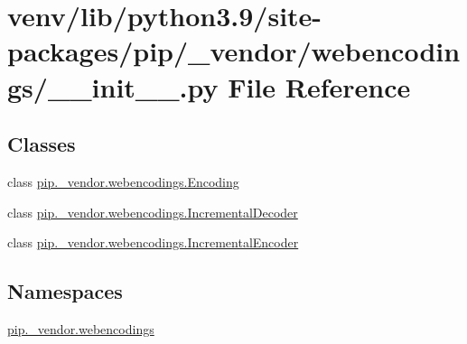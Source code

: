 \hypertarget{venv_2lib_2python3_89_2site-packages_2pip_2__vendor_2webencodings_2____init_____8py}{}\section{venv/lib/python3.9/site-\/packages/pip/\+\_\+vendor/webencodings/\+\_\+\+\_\+init\+\_\+\+\_\+.py File Reference}
\label{venv_2lib_2python3_89_2site-packages_2pip_2__vendor_2webencodings_2____init_____8py}
\subsection*{Classes}
\begin{DoxyCompactItemize}
\item 
class \hyperlink{classpip_1_1__vendor_1_1webencodings_1_1Encoding}{pip.\+\_\+vendor.\+webencodings.\+Encoding}
\item 
class \hyperlink{classpip_1_1__vendor_1_1webencodings_1_1IncrementalDecoder}{pip.\+\_\+vendor.\+webencodings.\+Incremental\+Decoder}
\item 
class \hyperlink{classpip_1_1__vendor_1_1webencodings_1_1IncrementalEncoder}{pip.\+\_\+vendor.\+webencodings.\+Incremental\+Encoder}
\end{DoxyCompactItemize}
\subsection*{Namespaces}
\begin{DoxyCompactItemize}
\item 
 \hyperlink{namespacepip_1_1__vendor_1_1webencodings}{pip.\+\_\+vendor.\+webencodings}
\end{DoxyCompactItemize}
